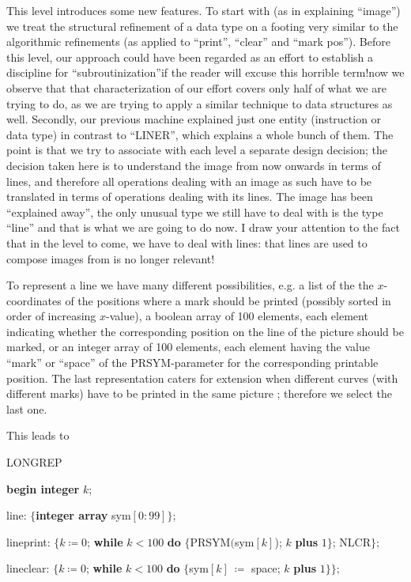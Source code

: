 This level introduces some new features. To start with (as in explaining ``image'') we treat the structural refinement of a data type on a footing very similar to the algorithmic refinements (as applied to ``print'', ``clear'' and ``mark pos''). Before this level, our approach could have been regarded as an effort to establish a discipline for ``subroutinization''\textemdash{}if the reader will excuse this horrible term!\textemdash{}now we observe that that characterization of  our effort covers only half of what we are trying to do, as we are trying to apply a similar technique to data structures as well. Secondly, our previous machine explained just one entity (instruction or data type) in contrast to ``LINER'', which explains a whole bunch of them. The point is that we try to associate with each level a separate design decision; the decision taken here is to understand the image from now onwards in terms of lines, and therefore all operations dealing with an image as such have to be translated in terms of operations dealing with its lines. The image has been ``explained away'', the only unusual type we still have to deal with is the type ``line'' and that is what we are going to do now. I draw your attention to the fact that in the level to come, we have to deal with lines: that lines are used to compose images from is no longer relevant!

To represent a line we have many different possibilities, e.g. a list of the the $x$-coordinates of the positions where a mark should be printed (possibly sorted in order of increasing $x$-value), a boolean array of 100 elements, each element indicating whether the corresponding position on the line of the picture should be marked, or an integer array of 100 elements, each element having the value ``mark'' or ``space'' of the PRSYM-parameter for the corresponding printable position. The last representation caters for extension when different curves (with different marks) have to be printed in the same picture ; therefore we select the last one.

This leads to

\noindent
LONGREP

\noindent
\textbf{begin integer} $k$;

\noindent
\quad line: $\{$\textbf{integer array} sym$[0 : 99]\}$;

\noindent
\quad lineprint: $\{k \coloneq 0$; \textbf{while} $k < 100$ \textbf{do} $\{$PRSYM$($sym$[k]$); $k$ \textbf{plus} $1\}$; NLCR$\};$

\noindent
\quad lineclear: $\{k \coloneq 0$; \textbf{while} $k < 100$ \textbf{do} $\{$sym$[k]\ \coloneq$ space; $k$ \textbf{plus} $1\}\};$

